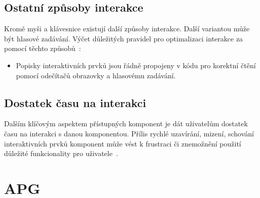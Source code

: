 \subsection{Ostatní způsoby interakce}


Kromě myši a klávesnice existují další způsoby interakce.
Další variantou může být hlasové zadávání.
Výčet důležitých pravidel pro optimalizaci interakce za pomocí těchto způsobů~\cite{w3-accessibility-principles}:

\begin{itemize}
  \item Popisky interaktivních prvků jsou řádně propojeny v kódu pro korektní čtění pomocí odečítačů obrazovky a hlasovému zadávání.
\end{itemize}

\subsection{Dostatek času na interakci}

Dalším klíčovým aspektem přístupných komponent je dát uživatelům dostatek času na interakci s danou komponentou.
Přílis rychlé uzavírání, mizení, schování interaktivních prvků komponent může vést k frustraci či znemožnění použití důležité funkcionality pro uživatele~\cite{w3-accessibility-principles}.

\section{APG}

